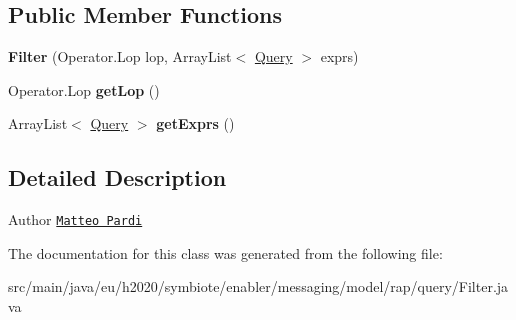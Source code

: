 \subsection*{Public Member Functions}
\begin{DoxyCompactItemize}
\item 
\mbox{\label{classeu_1_1h2020_1_1symbiote_1_1enabler_1_1messaging_1_1model_1_1rap_1_1query_1_1Filter_a6940c3dbb712047fc9242c67de87d791}} 
{\bfseries Filter} (Operator.\+Lop lop, Array\+List$<$ \hyperlink{classeu_1_1h2020_1_1symbiote_1_1enabler_1_1messaging_1_1model_1_1rap_1_1query_1_1Query}{Query} $>$ exprs)
\item 
\mbox{\label{classeu_1_1h2020_1_1symbiote_1_1enabler_1_1messaging_1_1model_1_1rap_1_1query_1_1Filter_a8b1a2f1e91ac9a791e2fbdf2e53fa07e}} 
Operator.\+Lop {\bfseries get\+Lop} ()
\item 
\mbox{\label{classeu_1_1h2020_1_1symbiote_1_1enabler_1_1messaging_1_1model_1_1rap_1_1query_1_1Filter_a646f8225846475c418a64cd645d73a91}} 
Array\+List$<$ \hyperlink{classeu_1_1h2020_1_1symbiote_1_1enabler_1_1messaging_1_1model_1_1rap_1_1query_1_1Query}{Query} $>$ {\bfseries get\+Exprs} ()
\end{DoxyCompactItemize}


\subsection{Detailed Description}
\begin{DoxyAuthor}{Author}
\href{mailto:m.pardi@nextworks.it}{\tt Matteo Pardi} 
\end{DoxyAuthor}


The documentation for this class was generated from the following file\+:\begin{DoxyCompactItemize}
\item 
src/main/java/eu/h2020/symbiote/enabler/messaging/model/rap/query/Filter.\+java\end{DoxyCompactItemize}
